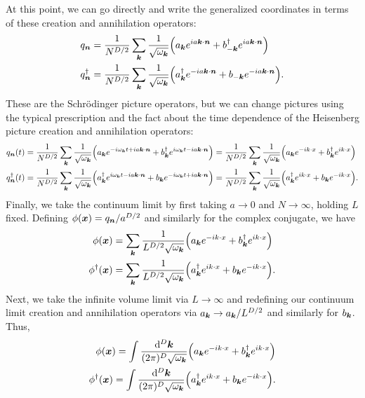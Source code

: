 {At this point, we can go directly and write the generalized coordinates in terms of these creation and annihilation operators:
\begin{align}
    q_{\vb*{n}} &= \frac{1}{N^{D/2}} \sum_{\vb*{k}} \frac{1}{\sqrt{\omega_{\vb*{k}}}} \Big( a_{\vb*{k}} e^{i a \vb*{k} \cdot \vb*{n}} + b_{-\vb*{k}}^{\dagger} e^{i a \vb*{k} \cdot \vb*{n}} \Big) \\
    q_{\vb*{n}}^{\dagger} &= \frac{1}{N^{D/2}} \sum_{\vb*{k}} \frac{1}{\sqrt{\omega_{\vb*{k}}}} \Big( a_{\vb*{k}}^{\dagger} e^{-i a \vb*{k} \cdot \vb*{n}} + b_{-\vb*{k}} e^{-i a \vb*{k} \cdot \vb*{n}} \Big)
.\end{align}
These are the Schr\"{o}dinger picture operators, but we can change pictures using the typical prescription and the fact about the time dependence of the Heisenberg picture creation and annihilation operators:
\begin{align}
    q_{\vb*{n}}(t) &= \frac{1}{N^{D/2}} \sum_{\vb*{k}} \frac{1}{\sqrt{\omega_{\vb*{k}}}} \Big( a_{\vb*{k}} e^{- i \omega_{\vb*{k}} t + i a \vb*{k} \cdot \vb*{n}} + b_{\vb*{k}}^{\dagger} e^{i \omega_{\vb*{k}} t - i a \vb*{k} \cdot \vb*{n}} \Big) = \frac{1}{N^{D/2}} \sum_{\vb*{k}} \frac{1}{\sqrt{\omega_{\vb*{k}}}} \Big( a_{\vb*{k}} e^{-i k \cdot x} + b_{\vb*{k}}^{\dagger} e^{i k \cdot x} \Big) \\
    q_{\vb*{n}}^{\dagger}(t) &= \frac{1}{N^{D/2}} \sum_{\vb*{k}} \frac{1}{\sqrt{\omega_{\vb*{k}}}} \Big( a_{\vb*{k}}^{\dagger} e^{i \omega_{\vb*{k}} t - i a \vb*{k} \cdot \vb*{n}} + b_{\vb*{k}} e^{-i \omega_{\vb*{k}}t + i a \vb*{k} \cdot \vb*{n}} \Big) = \frac{1}{N^{D/2}} \sum_{\vb*{k}} \frac{1}{\sqrt{\omega_{\vb*{k}}}} \Big( a_{\vb*{k}}^{\dagger} e^{i k \cdot x} + b_{\vb*{k}} e^{-ik \cdot x} \Big)
.\end{align}
Finally, we take the continuum limit by first taking $a \rightarrow 0$ and $N \rightarrow \infty$, holding $L$ fixed.
Defining $\phi(\vb*{x}) = q_{\vb*{n}} / a^{D/2}$ and similarly for the complex conjugate, we have
\begin{align}
    \phi(\vb*{x}) &= \sum_{\vb*{k}} \frac{1}{L^{D/2} \sqrt{\omega_{\vb*{k}}}} \Big( a_{\vb*{k}} e^{-i k \cdot x} + b_{\vb*{k}}^{\dagger} e^{i k \cdot x} \Big) \\
    \phi^{\dagger}(\vb*{x}) &= \sum_{\vb*{k}} \frac{1}{L^{D/2} \sqrt{\omega_{\vb*{k}}}} \Big( a_{\vb*{k}}^{\dagger} e^{i k \cdot x} + b_{\vb*{k}} e^{-i k \cdot x} \Big)
.\end{align}
Next, we take the infinite volume limit via $L \rightarrow \infty$ and redefining our continuum limit creation and annihilation operators via $a_{\vb*{k}} \rightarrow a_{\vb*{k}} / L^{D/2}$ and similarly for $b_{\vb*{k}}$.
Thus,
\begin{align}
    \phi(\vb*{x}) = \int \frac{\dd[D]{\vb*{k}}}{(2 \pi)^{D} \sqrt{\omega_{\vb*{k}}}} \Big( a_{\vb*{k}} e^{-i k \cdot x} + b_{\vb*{k}}^{\dagger} e^{i k \cdot x} \Big) \\
    \phi^{\dagger}(\vb*{x}) = \int \frac{\dd[D]{\vb*{k}}}{(2 \pi)^{D} \sqrt{\omega_{\vb*{k}}}} \Big( a_{\vb*{k}}^{\dagger} e^{i k \cdot x} + b_{\vb*{k}} e^{-i k \cdot x} \Big)
.\end{align}

}


